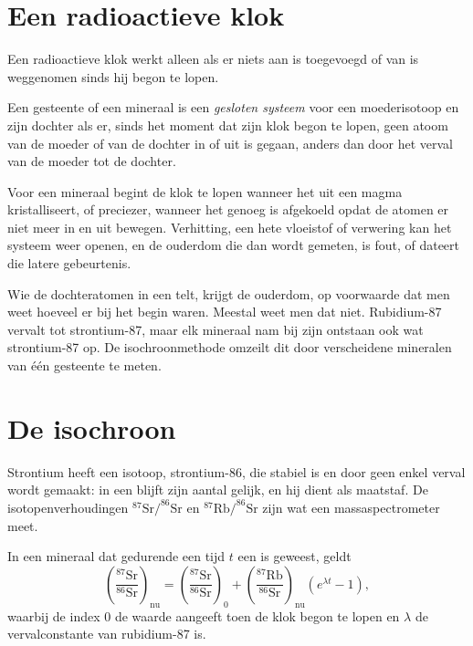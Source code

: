 \section{Een radioactieve klok}

Een radioactieve klok werkt alleen als er niets aan is toegevoegd of van is
weggenomen sinds hij begon te lopen.

\begin{definition}\label{def:g12:age-of-the-earth:closed-system}
Een gesteente of een mineraal is een \emph{gesloten systeem} voor een
moederisotoop en zijn dochter als er, sinds het moment dat zijn klok begon te lopen,
geen atoom van de moeder of van de dochter in of uit is gegaan, anders dan
door het verval van de moeder tot de dochter.
\end{definition}

Voor een mineraal begint de klok te lopen wanneer het uit een magma kristalliseert, of
preciezer, wanneer het genoeg is afgekoeld opdat de atomen er niet meer in en uit
bewegen. Verhitting, een hete
vloeistof of verwering kan het systeem weer openen, en de ouderdom die dan wordt gemeten, is
fout, of dateert die latere gebeurtenis.

Wie de dochteratomen in een  telt, krijgt de ouderdom, op voorwaarde dat men
weet hoeveel er bij het begin waren. Meestal weet men dat niet. Rubidium-87
vervalt tot strontium-87, maar elk mineraal nam bij zijn ontstaan ook wat strontium-87
op. De isochroonmethode omzeilt dit door verscheidene
mineralen van één gesteente te meten.

\section{De isochroon}

Strontium heeft een isotoop, strontium-86, die stabiel is en door geen enkel
verval wordt gemaakt: in een  blijft zijn aantal gelijk, en hij dient als
maatstaf. De isotopenverhoudingen $^{87}\mathrm{Sr}/^{86}\mathrm{Sr}$ en
$^{87}\mathrm{Rb}/^{86}\mathrm{Sr}$ zijn wat een massaspectrometer meet.

\begin{theorem}[De isochroonvergelijking]\label{thm:g12:age-of-the-earth:isochron}
In een mineraal dat gedurende een tijd $t$ een  is geweest, geldt
\[
  \left(\frac{^{87}\mathrm{Sr}}{^{86}\mathrm{Sr}}\right)_{\text{nu}}
  = \left(\frac{^{87}\mathrm{Sr}}{^{86}\mathrm{Sr}}\right)_{0}
  + \left(\frac{^{87}\mathrm{Rb}}{^{86}\mathrm{Sr}}\right)_{\text{nu}}
  \left(e^{\lambda t} - 1\right),
\]
waarbij de index 0 de waarde aangeeft toen de klok begon te lopen en $\lambda$
de vervalconstante van rubidium-87 is.
\end{theorem}

